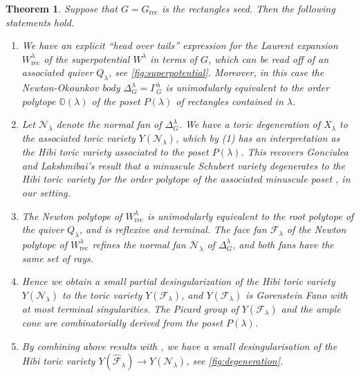 \documentclass{amsart}
\newtheorem{mainthm}{Theorem}
\theoremstyle{definition}
\numberwithin{equation}{section}
\newcommand{\FF}{\mathcal{F}}
\newcommand{\CC}{\mathcal{N}}
\newcommand{\rect}{\mathrm{rec}}
\newcommand{\OO}{\mathbb{O}}
\newcommand{\N}{\mathcal{N}}
\begin{document}
\begin{mainthm}\label{t:mainrectangles}
Suppose that  $G=G_{\rect}$ is the rectangles seed.  Then the following statements hold.
\begin{enumerate}
\item	 We have an explicit ``head over tails''
expression for the Laurent expansion $W^{\lambda}_{\rect}$ of the superpotential $W^{\lambda}$
in terms of $G$, which 
can be read off of an associated quiver $Q_\lambda$,
see \cref{fig:superpotential}. Moreover, in this case the Newton-Okounkov body $\Delta_G^\lambda=\Gamma^\lambda_G$  
is unimodularly equivalent to the \emph{order polytope $\OO(\lambda)$} of the poset $P(\lambda)$
of rectangles contained in $\lambda$.
\item 
Let $\CC_\lambda$ denote the normal fan of $\Delta^\lambda_G$.  We have a toric degeneration of $X_{\lambda}$ to the associated toric variety $Y(\CC_\lambda)$, which by (1) has an interpretation as the \emph{Hibi toric variety} associated to the poset $P(\lambda)$. 
This recovers Gonciulea and Lakshmibai's result that a minuscule Schubert variety degenerates to the Hibi toric variety for the order polytope of the associated minuscule poset \cite[Theorem 7.34]{GL}, in our setting.
\item 
The Newton polytope of $W_{\rect}^{\lambda}$ is unimodularly equivalent to the \emph{root polytope} of the quiver $Q_\lambda$, and is reflexive and terminal. The face fan $\FF_{\lambda}$ of the Newton polytope of $W_{\rect}^{\lambda}$
refines the normal fan $\N_{\lambda}$
of $\Delta_G^{\lambda}$, and both fans have the same set of rays.
\item Hence 
we obtain a small partial desingularization of
the Hibi toric variety $Y(\N_{\lambda})$ 
to the toric variety $Y(\FF_{\lambda})$, and  
$Y(\FF_{\lambda})$ 
is  Gorenstein Fano  
with at most
terminal singularities. The Picard group of $Y(\FF_\lambda)$ and the ample cone are combinatorially derived from the poset $P(\lambda)$.
\item By combining above results with \cite[Theorem E]{RWReflexive}, 
we have a 
small desingularisation of the Hibi toric variety
$Y(\widehat{\FF}_{\lambda}) 
		\to Y(\CC_{\lambda})$,
see \cref{fig:degeneration}. 
\end{enumerate}
\end{mainthm}
\end{document}
